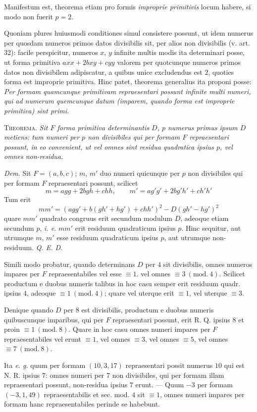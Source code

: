 Manifestum est, theorema etiam pro formis \textit{improprie primitivis} locum habere, si modo non fuerit $p=2$.

Quoniam plures huiusmodi conditiones simul consistere possunt, ut idem numerus per quosdam numeros primos datos divisibilis sit, per alios non divisibilis (v. art. 32): facile perspicitur, numeros $x$, $y$ infinite multis modis ita determinari posse, ut forma primitiva $axx+2bxy+cyy$ valorem per quotcunque numeros primos datos non divisibilem adipiscatur, a quibus unice excludendus est $2$, quoties forma est improprie primitiva. Hinc patet, theorema generalius ita proponi posse: \textit{Per formam quamcunque primitivam repraesentari possunt infinite multi numeri, qui ad numerum quemcunque datum (imparem, quando forma est improprie primitiva) sint primi.}

\textsc{Theorema.} \textit{Sit $F$ forma primitiva determinantis $D$, $p$ numerus primus ipsum $D$ metiens: tum numeri per $p$ non divisibiles qui per formam $F$ repraesentari possunt, in eo convenient, ut vel omnes sint residua quadratica ipsius $p$, vel omnes non-residua.}

\textit{Dem.} Sit $F=(a,b,c)$; $m$, $m'$ duo numeri quicunque per $p$ non divisibiles qui per formam $F$ repraesentari possunt, scilicet
\[
m=agg+2bgh+chh,\qquad m'=ag'g'+2bg'h'+ch'h'
\]
Tum erit
\[
mm'=(agg'+b(gh'+hg')+chh')^2-D(gh'-hg')^2
\]
quare $mm'$ quadrato congruus erit secundum modulum $D$, adeoque etiam secundum $p$, \textit{i. e.} $mm'$ erit residuum quadraticum ipsius $p$. Hinc sequitur, aut utrumque $m$, $m'$ esse residuum quadraticum ipsius $p$, aut utrumque non-residuum. \textit{Q. E. D.}

Simili modo probatur, quando determinans $D$ per $4$ sit divisibilis, omnes numeros impares per $F$ repraesentabiles vel esse $\equiv1$. vel omnes $\equiv3\ (\mathrm{mod.}\ 4)$. Scilicet productum e duobus numeris talibus in hoc casu semper erit residuum quadr. ipsius $4$, adeoque $\equiv1\ (\mathrm{mod.}\ 4)$; quare vel uterque erit $\equiv1$, vel uterque $\equiv3$.

Denique quando $D$ per $8$ est divisibilis, productum e duobus numeris quibuscunque imparibus, qui per $F$ repraesentari possunt, erit R. Q. ipsius $8$ et proin $\equiv1\ (\mathrm{mod.}\ 8)$. Quare in hoc casu omnes numeri impares per $F$ repraesentabiles vel erunt $\equiv1$, vel omnes $\equiv3$, vel omnes $\equiv5$, vel omnes $\equiv7\ (\mathrm{mod.}\ 8)$.

Ita \textit{e. g.} quum per formam $(10,3,17)$ repraesentari possit numerus $10$ qui est N. R. ipsius $7$: omnes numeri per $7$ non divisibiles, qui per formam illam repraesentari possunt, non-residua ipsius $7$ erunt. --- Quum $-3$ per formam $(-3,1,49)$ repraesentabilis et sec. mod. $4$ sit $\equiv1$, omnes numeri impares per formam hanc repraesentabiles perinde se habebunt.

